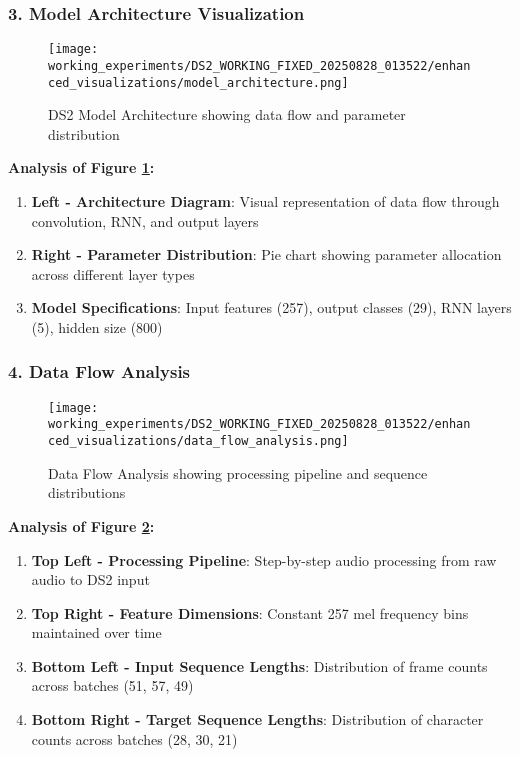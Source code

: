 \documentclass[11pt,a4paper]{article}
\begin{document}
\subsubsection{3. Model Architecture Visualization}
\begin{figure}[H]
\centering
\texttt{[image: working\_experiments/DS2\_WORKING\_FIXED\_20250828\_013522/enhanced\_visualizations/model\_architecture.png]}
\caption{DS2 Model Architecture showing data flow and parameter distribution}
\label{fig:architecture}
\end{figure}

\textbf{Analysis of Figure \ref{fig:architecture}:}
\begin{enumerate}
    \item \textbf{Left - Architecture Diagram}: Visual representation of data flow through convolution, RNN, and output layers
    \item \textbf{Right - Parameter Distribution}: Pie chart showing parameter allocation across different layer types
    \item \textbf{Model Specifications}: Input features (257), output classes (29), RNN layers (5), hidden size (800)
\end{enumerate}

\subsubsection{4. Data Flow Analysis}
\begin{figure}[H]
\centering
\texttt{[image: working\_experiments/DS2\_WORKING\_FIXED\_20250828\_013522/enhanced\_visualizations/data\_flow\_analysis.png]}
\caption{Data Flow Analysis showing processing pipeline and sequence distributions}
\label{fig:dataflow}
\end{figure}

\textbf{Analysis of Figure \ref{fig:dataflow}:}
\begin{enumerate}
    \item \textbf{Top Left - Processing Pipeline}: Step-by-step audio processing from raw audio to DS2 input
    \item \textbf{Top Right - Feature Dimensions}: Constant 257 mel frequency bins maintained over time
    \item \textbf{Bottom Left - Input Sequence Lengths}: Distribution of frame counts across batches (51, 57, 49)
    \item \textbf{Bottom Right - Target Sequence Lengths}: Distribution of character counts across batches (28, 30, 21)
\end{enumerate}
\end{document}
